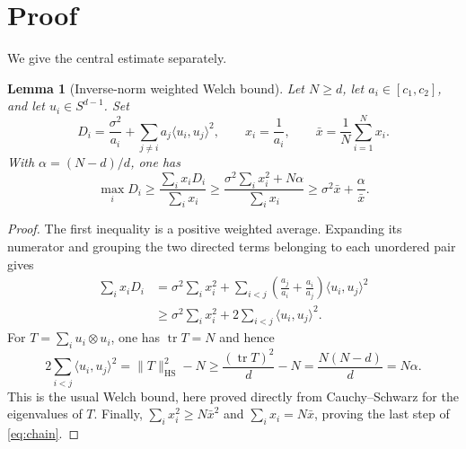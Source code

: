 \documentclass[11pt]{article}
\newtheorem{lemma}{Lemma}
\newcommand{\ip}[2]{\langle #1,#2\rangle}
\newcommand{\HS}{\mathrm{HS}}
\begin{document}
\section{Proof}

We give the central estimate separately.

\begin{lemma}[Inverse-norm weighted Welch bound]\label{lem:key}
Let $N\ge d$, let $a_i\in[c_1,c_2]$, and let $u_i\in S^{d-1}$.  Set
\[
 D_i=\frac{\sigma^2}{a_i}
       +\sum_{j\ne i}a_j\ip{u_i}{u_j}^2,\qquad
 x_i=\frac1{a_i},\qquad \bar x=\frac1N\sum_{i=1}^N x_i.
\]
With $\alpha=(N-d)/d$, one has
\begin{equation}\label{eq:chain}
 \max_iD_i
 \ge \frac{\sum_i x_iD_i}{\sum_i x_i}
 \ge \frac{\sigma^2\sum_i x_i^2+N\alpha}{\sum_i x_i}
 \ge \sigma^2\bar x+\frac{\alpha}{\bar x}.
\end{equation}
\end{lemma}

\begin{proof}
The first inequality is a positive weighted average.  Expanding its numerator
and grouping the two directed terms belonging to each unordered pair gives
\begin{align*}
 \sum_i x_iD_i
 &=\sigma^2\sum_i x_i^2
   +\sum_{i<j}
       \left(\frac{a_j}{a_i}+\frac{a_i}{a_j}\right)
       \ip{u_i}{u_j}^2\\
 &\ge \sigma^2\sum_i x_i^2
   +2\sum_{i<j}\ip{u_i}{u_j}^2.
\end{align*}
For $T=\sum_i u_i\otimes u_i$, one has $\operatorname{tr}T=N$ and hence
\[
 2\sum_{i<j}\ip{u_i}{u_j}^2
 =\lVert T\rVert_{\HS}^2-N
 \ge \frac{(\operatorname{tr}T)^2}{d}-N
 =\frac{N(N-d)}d=N\alpha.
\]
This is the usual Welch bound, here proved directly from Cauchy--Schwarz for
the eigenvalues of $T$.  Finally,
$\sum_i x_i^2\ge N\bar x^2$ and $\sum_i x_i=N\bar x$, proving the last step
of \eqref{eq:chain}.
\end{proof}
\end{document}
